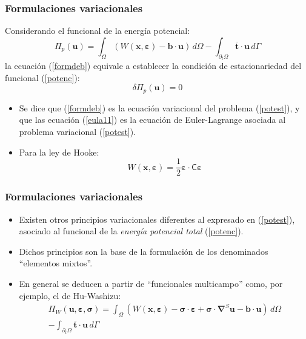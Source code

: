 \documentclass[10pt, aspectratio=43]{beamer}
\begin{document}
\begin{frame}
\frametitle{Formulaciones variacionales}
Considerando el funcional de la energía potencial:
\begin{equation}
\Pi_p(\bm{u})=
\int_{\Omega} \left(
W(\bm{x},\bm{\varepsilon})-\bm{b} \cdot \bm{u}\right) \, d \Omega
-\int_{\partial_t \Omega} \overline{\bm{t}}\cdot\bm{u} \, d \Gamma\label{potenc}
\end{equation}
la ecuación (\ref{formdeb}) equivale a establecer la condición de
estacionariedad del funcional (\ref{potenc}):
\begin{equation}
\delta \Pi_p(\bm{u})=0 \label{potest}
\end{equation}
\begin{itemize}
\item Se dice que (\ref{formdeb}) es la ecuación variacional del problema
(\ref{potest}), y que las ecuación (\ref{eula11}) es la ecuación de
Euler-Lagrange asociada al problema variacional (\ref{potest}).
\item Para la ley de Hooke:
\begin{equation}
W(\bm{x},\bm{\varepsilon})=\frac{1}{2} \bm{\varepsilon} \cdot 
\bm{\mathsf{C}} \bm{\varepsilon}
\end{equation}
\end{itemize}
\end{frame}
\begin{frame}
\frametitle{Formulaciones variacionales}
\begin{itemize}
\item Existen otros principios variacionales diferentes al expresado en
(\ref{potest}), asociado al funcional de la {\em energía potencial
total} (\ref{potenc}).
\item Dichos principios son la base de la formulación de
los denominados ``elementos mixtos''.
\item En general se deducen a partir de ``funcionales multicampo'' como,
por ejemplo, el de Hu-Washizu:
\begin{multline*}
\Pi_W(\bm{u},\bm{\varepsilon},\bm{\sigma})=
\int_{\Omega} \left(
W(\bm{x},\bm{\varepsilon})-\bm{\sigma}\cdot\bm{\varepsilon}+
\bm{\sigma}\cdot\bm{\nabla}^{S}\bm{u}-\bm{b} \cdot \bm{u}\right) \, d \Omega \\
-\int_{\partial_t \Omega} \overline{\bm{t}}\cdot\bm{u} \, d \Gamma\label{hu-was}
\end{multline*}
\end{itemize}
\end{frame}
\end{document}
